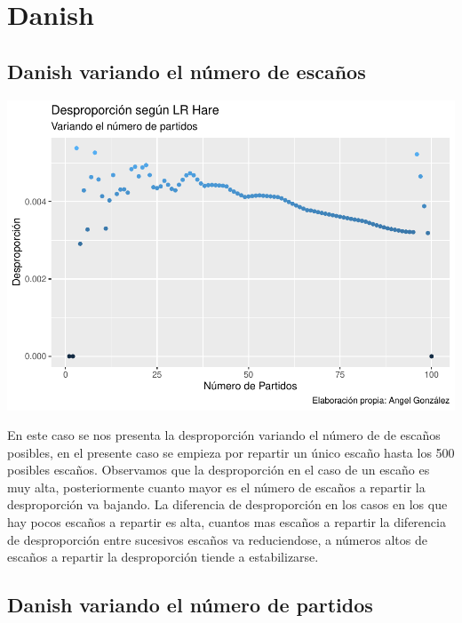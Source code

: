 \documentclass[12pt,a4paper,]{book}
\numberwithin{dummy}{section}
\theoremstyle{ocrenumbox}
\theoremstyle{blacknumex}
\theoremstyle{blacknumbox}
\theoremstyle{ocrenum}
\theoremstyle{ocrenum}
\begin{document}
\hypertarget{danish}{%
\section{Danish}\label{danish}}

\hypertarget{danish-variando-el-nuxfamero-de-escauxf1os}{%
\subsection{Danish variando el número de
escaños}\label{danish-variando-el-nuxfamero-de-escauxf1os}}

\begin{center}\includegraphics[width=0.95\linewidth]{figurasR/unnamed-chunk-42-1} \end{center}

En este caso se nos presenta la desproporción variando el número de de
escaños posibles, en el presente caso se empieza por repartir un único
escaño hasta los 500 posibles escaños. Observamos que la desproporción
en el caso de un escaño es muy alta, posteriormente cuanto mayor es el
número de escaños a repartir la desproporción va bajando. La diferencia
de desproporción en los casos en los que hay pocos escaños a repartir es
alta, cuantos mas escaños a repartir la diferencia de desproporción
entre sucesivos escaños va reduciendose, a números altos de escaños a
repartir la desproporción tiende a estabilizarse.

\hypertarget{danish-variando-el-nuxfamero-de-partidos}{%
\subsection{Danish variando el número de
partidos}\label{danish-variando-el-nuxfamero-de-partidos}}
\end{document}
